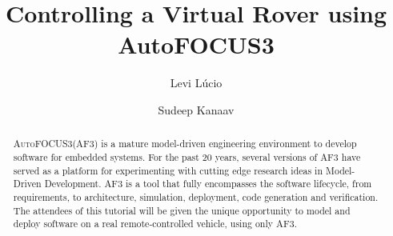 \documentclass[runningheads]{llncs}
\newcommand\levi[1]{\nb{Levi}{\textcolor{teal}{#1}}}
\newcommand{\af}{\textsc{AF3}\xspace}
\newcommand{\autofocus}{\textsc{AutoFOCUS3}\xspace}
\begin{document}
%
\title{Controlling a Virtual Rover using AutoFOCUS3}
%
%
\author{Levi L\'ucio \and
Sudeep Kanaav} 
%
%
%
\maketitle              %
%
\begin{abstract}
\autofocus (\af) is a mature model-driven engineering environment to develop
software for embedded systems. For the past 20 years, several versions of \af
have served as a platform for experimenting with cutting edge research ideas in
Model-Driven Development.
\af is a tool that fully encompasses the software lifecycle, from requirements,
to architecture, simulation, deployment, code generation and verification. The
attendees of this tutorial will be given the unique opportunity to model and deploy
software on a real remote-controlled vehicle, using only \af.\levi{finish this
abstract}
 
\end{abstract}
  




  









 

 

\end{document}
